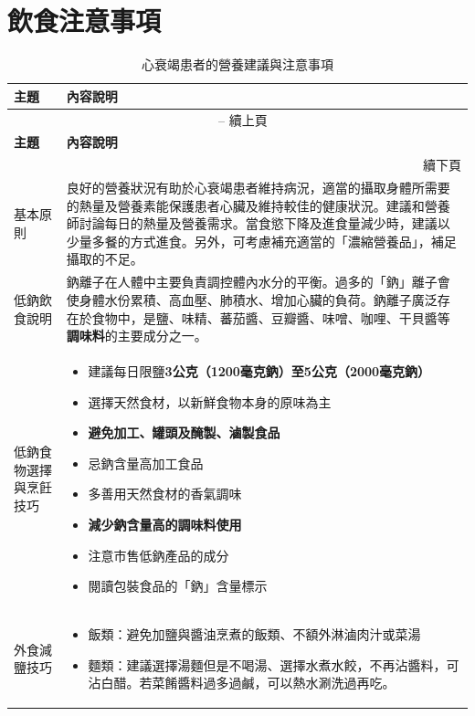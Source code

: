 \documentclass[nols]{tufte-book}
\begin{document}
\chapter{飲食注意事項}
\begin{longtable}{|p{}|p{}|}
\caption{心衰竭患者的營養建議與注意事項} \label{tab:nutrition} \\
\hline
\textbf{主題} & \textbf{內容說明} \\
\hline
\endfirsthead

\multicolumn{2}{c}{\tablename\ \thetable{} -- 續上頁} \\
\hline
\textbf{主題} & \textbf{內容說明} \\
\hline
\endhead

\hline
\multicolumn{2}{r}{續下頁} \\
\endfoot

\hline
\endlastfoot

基本原則 & 良好的營養狀況有助於心衰竭患者維持病況，適當的攝取身體所需要的熱量及營養素能保護患者心臟及維持較佳的健康狀況。建議和營養師討論每日的熱量及營養需求。當食慾下降及進食量減少時，建議以少量多餐的方式進食。另外，可考慮補充適當的「濃縮營養品」，補足攝取的不足。 \\
\hline

低鈉飲食說明 & 鈉離子在人體中主要負責調控體內水分的平衡。過多的「鈉」離子會使身體水份累積、高血壓、肺積水、增加心臟的負荷。鈉離子廣泛存在於食物中，是鹽、味精、蕃茄醬、豆瓣醬、味噌、咖哩、干貝醬等\textbf{調味料}的主要成分之一。 \\
\hline

低鈉食物選擇與烹飪技巧 & 
\begin{itemize}
\item 建議每日限鹽\textbf{3公克（1200毫克鈉）至5公克（2000毫克鈉）}
\item 選擇天然食材，以新鮮食物本身的原味為主
\item \textbf{避免加工、罐頭及醃製、滷製食品}
\item 忌鈉含量高加工食品
\item 多善用天然食材的香氣調味
\item \textbf{減少鈉含量高的調味料使用}
\item 注意市售低鈉產品的成分
\item 閱讀包裝食品的「鈉」含量標示
\end{itemize} \\
\hline

外食減鹽技巧 & 
\begin{itemize}
\item 飯類：避免加鹽與醬油烹煮的飯類、不額外淋滷肉汁或菜湯
\item 麵類：建議選擇湯麵但是不喝湯、選擇水煮水餃，不再沾醬料，可沾白醋。若菜餚醬料過多過鹹，可以熱水涮洗過再吃。
\end{itemize} \\
\hline


\end{longtable}
\end{document}
